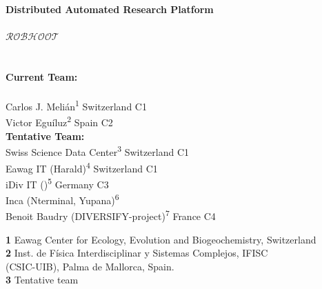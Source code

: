 \documentclass[english,12pt]{article}
\date{}
\begin{document}
\begin{flushleft}
  \textbf{\Large Distributed Automated Research Platform\\
    \\
    \vspace{0.5cm}
    $\mathcal{ROBHOOT}$}\\
  \\
  \\
  \vspace{0.5 in}
  {\bf Current Team:}\\
  \\
    Carlos J. Meli\'an\textsuperscript{1} Switzerland C1\\
    Victor Egu\'iluz\textsuperscript{2} Spain C2\\

    {\bf Tentative Team:}\\
    Swiss Science Data Center\textsuperscript{3} Switzerland C1\\
    Eawag IT (Harald)\textsuperscript{4} Switzerland C1\\
    iDiv IT ()\textsuperscript{5} Germany C3\\
    Inca (Nterminal, Yupana)\textsuperscript{6}\\
    Benoit Baudry (DIVERSIFY-project)\textsuperscript{7} France C4

  
  \vspace{0.5cm} 
  \textbf{1} Eawag Center for Ecology, Evolution and Biogeochemistry, Switzerland\\
  \textbf{2} Inst. de Física Interdisciplinar y Sistemas Complejos, IFISC\\
  (CSIC-UIB), Palma de Mallorca, Spain.\\
  \textbf{3} Tentative team
\\
\bigskip
\end{flushleft}
\newpage




\tableofcontents
\newpage
\end{document}
